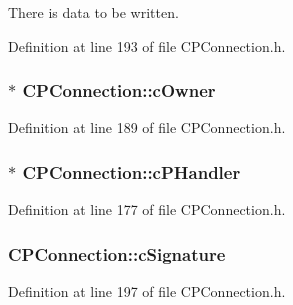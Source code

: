 \-There is data to be written. 



\-Definition at line 193 of file \-C\-P\-Connection.\-h.

\hypertarget{class_c_p_connection_a504332c07c9fb47362b5c490182833e9}{
\subsubsection[{c\-Owner}]{$\ast$ {\bf \-C\-P\-Connection\-::c\-Owner}}}\label{class_c_p_connection_a504332c07c9fb47362b5c490182833e9}


\-Definition at line 189 of file \-C\-P\-Connection.\-h.

\hypertarget{class_c_p_connection_a9e5914bdbd8aeabe9609d7aa8f03babe}{
\subsubsection[{c\-P\-Handler}]{$\ast$ {\bf \-C\-P\-Connection\-::c\-P\-Handler}}}\label{class_c_p_connection_a9e5914bdbd8aeabe9609d7aa8f03babe}


\-Definition at line 177 of file \-C\-P\-Connection.\-h.

\hypertarget{class_c_p_connection_aa9f6fb20fce6e497615335f8eed8591c}{
\subsubsection[{c\-Signature}]{ {\bf \-C\-P\-Connection\-::c\-Signature}}}\label{class_c_p_connection_aa9f6fb20fce6e497615335f8eed8591c}


\-Definition at line 197 of file \-C\-P\-Connection.\-h.

